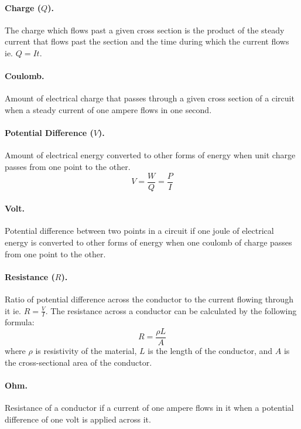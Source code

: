 \documentclass{article}
\begin{document}
\paragraph{Charge ($Q$).} The charge which flows past a given cross section is the product of the steady current that flows past the section and the time during which the current flows ie. $Q = It$.

\paragraph{Coulomb.} Amount of electrical charge that passes through a given cross section of a circuit when a steady current of one ampere flows in one second.

\paragraph{Potential Difference ($V$).} Amount of electrical energy converted to other forms of energy when unit charge passes from one point to the other. \begin{equation}
V = \frac{W}{Q} = \frac{P}{I}
\end{equation}

\paragraph{Volt.} Potential difference between two points in a circuit if one joule of electrical energy is converted to other forms of energy when one coulomb of charge passes from one point to the other.

\paragraph{Resistance ($R$).} Ratio of potential difference across the conductor to the current flowing through it ie. $R = \frac{V}{I}$. The resistance across a conductor can be calculated by the following formula: \begin{equation}
R = \frac{\rho L}{A}
\end{equation} where $\rho$ is resistivity of the material, $L$ is the length of the conductor, and $A$ is the cross-sectional area of the conductor.

\paragraph{Ohm.} Resistance of a conductor if a current of one ampere flows in it when a potential difference of one volt is applied across it.
\end{document}
